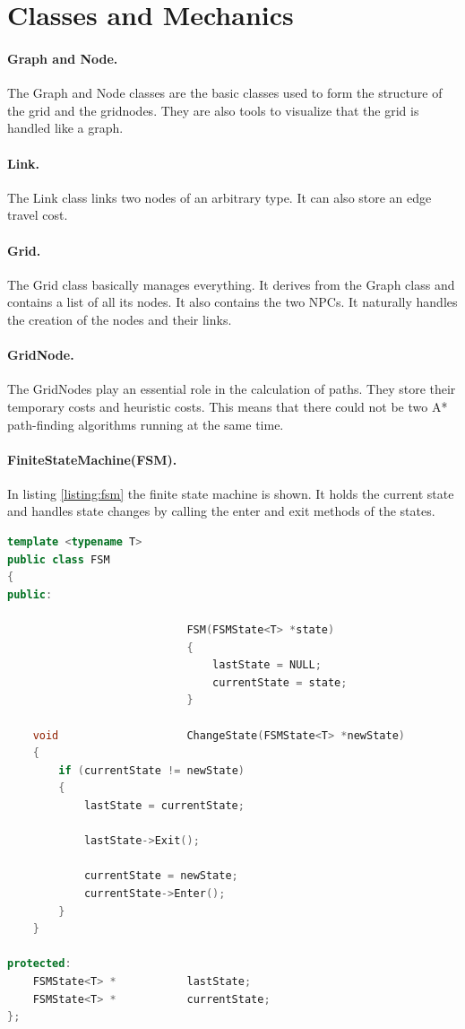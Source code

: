 \documentclass[12pt]{article}
\begin{document}
\section{Classes and Mechanics}
\label{section:classes}


\paragraph{Graph and Node.}
The Graph and Node classes are the basic classes used to form the structure of the grid and the gridnodes. They are also tools to visualize that the grid is handled like a graph.

\paragraph{Link.}
The Link class links two nodes of an arbitrary type. It can also store an edge travel cost.

\paragraph{Grid.}
The Grid class basically manages everything. It derives from the Graph class and contains a list of all its nodes. It also contains the two NPCs. It naturally handles the creation of the nodes and their links.

\paragraph{GridNode.}
The GridNodes play an essential role in the calculation of paths. They store their temporary costs and heuristic costs. This means that there could not be two A* path-finding algorithms running at the same time.

\paragraph{FiniteStateMachine(FSM).}

In listing \ref{listing:fsm} the finite state machine is shown. It holds the current state and handles state changes by calling the enter and exit methods of the states.

\begin{lstlisting}[caption=The finite state machine.,label=listing:fsm,language=C++]
template <typename T>
public class FSM
{
public:

							FSM(FSMState<T> *state)
							{
								lastState = NULL;
								currentState = state;
							}

	void					ChangeState(FSMState<T> *newState)
	{
		if (currentState != newState)
		{
			lastState = currentState;

			lastState->Exit();
			
			currentState = newState;
			currentState->Enter();
		}
	}

protected:
	FSMState<T> *			lastState;
	FSMState<T> *			currentState;
};
\end{lstlisting}
\end{document}
